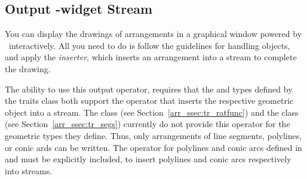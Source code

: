 \subsection{Output \qt{}-widget Stream}\label{arr_ssec:qt_stream}
You can display the drawings of arrangements in a graphical window
powered by \qt\ interactively. All you need to do is follow the
guidelines for handling  objects, and apply the
{\em inserter}, which inserts an arrangement into a 
stream to complete the drawing.

The ability to use this output operator, requires that the
 and  types defined by the
traits class both support the \ccc{<<} operator that inserts the
respective geometric object into a  stream. The
 class (see
Section~\ref{arr_ssec:tr_ratfunc}) and the 
class (see Section~\ref{arr_ssec:tr_segs}) currently do not provide
this operator for the geometric types they define. Thus, only
arrangements of line segments, polylines, or conic ards can be written.
The \ccc{<<} operator for polylines and conic arcs defined in
 and
must be explicitly included, to insert polylines and conic arcs
respectively into  streams.



